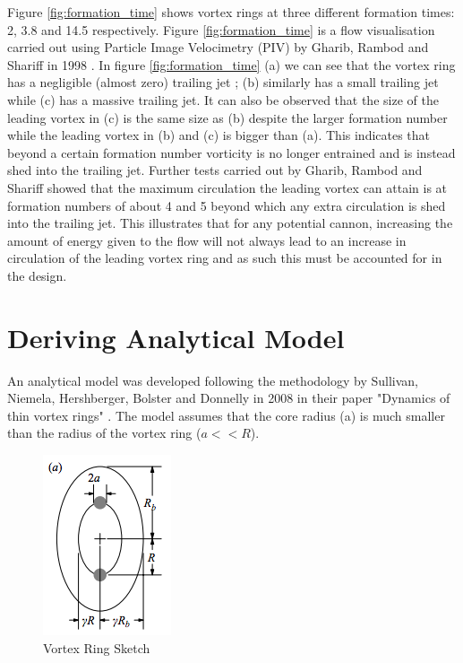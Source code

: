 \documentclass[a4paper,12pt]{article}
\begin{document}
Figure \ref{fig:formation_time} shows vortex rings at three different formation times: 2, 3.8 and 14.5 respectively. Figure \ref{fig:formation_time} is a flow visualisation carried out using Particle Image Velocimetry (PIV) by Gharib, Rambod and Shariff in 1998 \cite{universal_timescale}. In figure \ref{fig:formation_time} (a) we can see that the vortex ring has a negligible (almost zero) trailing jet ; (b) similarly has a small trailing jet while (c) has a massive trailing jet. It can also be observed that the size of the leading vortex in (c) is the same size as (b) despite the larger formation number while the leading vortex in (b) and (c) is bigger than (a). This indicates that beyond a certain formation number vorticity is no longer entrained and is instead shed into the trailing jet. Further tests carried out by Gharib, Rambod and Shariff showed that the maximum circulation the leading vortex can attain is at formation numbers of about 4 and 5 beyond which any extra circulation is shed into the trailing jet. This illustrates that for any potential cannon, increasing the amount of energy given to the flow will not always lead to an increase in circulation of the leading vortex ring and as such this must be accounted for in the design.
\newpage
\section{Deriving Analytical Model}
An analytical model was developed following the methodology by Sullivan, Niemela, Hershberger, Bolster and Donnelly in 2008 in their paper "Dynamics of thin vortex rings" \cite{dynamics_thin_vortexrings}. The model assumes that the core radius (a) is much smaller than the radius of the vortex ring ($a << R$).


\begin{figure}[ht]
\centering
\includegraphics[width=0.3\linewidth]{vortexring_spec.png}
\caption{Vortex Ring Sketch \cite{dynamics_thin_vortexrings}}
\label{fig:vortexring_spec}
\end{figure}
\end{document}
